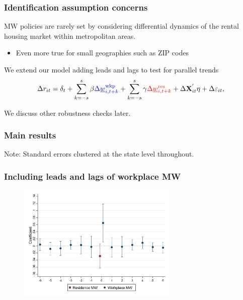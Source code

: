 \documentclass[aspectratio=169, t]{beamer}
\newcommand{\mw}{\underline{w}}
\newcommand{\wkp}{\text{wkp}}
\newcommand{\res}{\text{res}}
\begin{document}
\begin{frame}[label = dyn_model]
    \frametitle{Identification assumption concerns}
    
    MW policies are rarely set by considering differential dynamics of the 
    rental housing market within metropolitan areas.
    \begin{itemize}
        \item Even more true for small geographies such as ZIP codes
    \end{itemize}

    \vspace{2mm}
    \pause
    We extend our model adding leads and lags to test for parallel trends
    $$
    \Delta r_{it} = \delta_t +
        \sum_{k=-s}^{s} \beta {\color{blue}\Delta \mw^{\wkp}_{i,t+k}} +
        \sum_{k=-s}^{s} \gamma {\color{red} \Delta \mw^{\res}_{i,t+k}} + 
        \Delta \mathbf{X}^{'}_{it} \eta + 
        \Delta \varepsilon_{it} ,
    $$

    \vspace{2mm}
    We discuss other robustness checks later.
\end{frame}

\begin{frame}[label = static]
    \frametitle{Main results}

    
    
    \vspace{2mm}
    \footnotesize
    Note: Standard errors clustered at the state level throughout.

\end{frame}

\begin{frame}[label = dyn_baseline_plot]
    \frametitle{Including leads and lags of workplace MW}

    \begin{figure}
        \centering
        \includegraphics[width=0.68\textwidth]{fd_baseline/output/fd_both_mw_wkp_only_dynamic.png}
    \end{figure}
    
    \hyperlink{exclude_res}{}
    \hyperlink{res_only_dyn}{}
    \hyperlink{both_dyn}{}
\end{frame}
\end{document}
